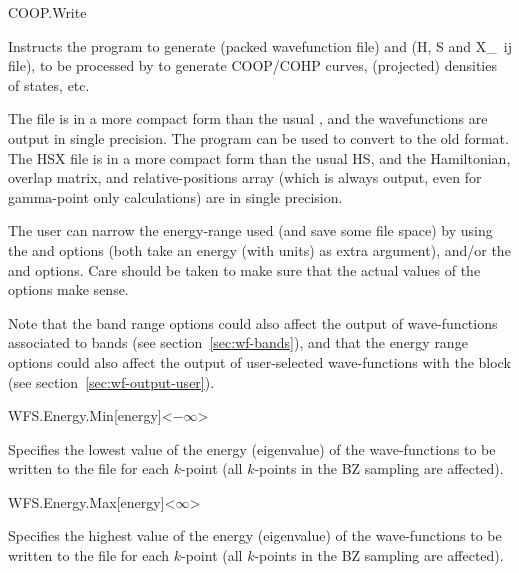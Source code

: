 \begin{fdflogicalF}{COOP.Write}
  
  Instructs the program to generate  (packed
  wavefunction file) and   (H, S and X\_~{ij} file),
  to be processed by  to generate COOP/COHP curves,
  (projected) densities of states, etc.

  The  file is in a more compact form than the usual
  , and the wavefunctions are output in single
  precision. The  program can be used to
  convert to the old format.  The HSX file is in a more compact form
  than the usual HS, and the Hamiltonian, overlap matrix, and
  relative-positions array (which is always output, even for
  gamma-point only calculations) are in single precision.

  The user can narrow the energy-range used (and save some file space)
  by using the  and  options
  (both take an energy (with units) as extra argument), and/or the
   and  options. Care should be
  taken to make sure that the actual values of the options make sense.

  Note that the band range options could also affect the output of
  wave-functions associated to bands (see section~\ref{sec:wf-bands}),
  and that the energy range options could also affect the output of
  user-selected wave-functions with the  block
  (see section~\ref{sec:wf-output-user}).

\end{fdflogicalF}


\begin{fdfentry}{WFS.Energy.Min}[energy]<$-\infty$>
  
  Specifies the lowest value of the energy (eigenvalue) of the
  wave-functions to be written to the file
   for each $k$-point (all $k$-points in
  the BZ sampling are affected).

\end{fdfentry}

\begin{fdfentry}{WFS.Energy.Max}[energy]<$\infty$>
  
  Specifies the highest value of the energy (eigenvalue) of the
  wave-functions to be written to the file  for
  each $k$-point (all $k$-points in the BZ sampling are affected).

\end{fdfentry}





